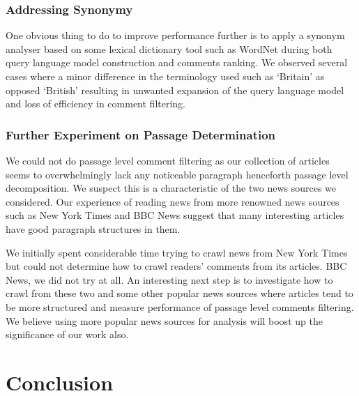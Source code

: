 \documentclass[article]{IEEEtran}
\begin{document}
\subsubsection{Addressing Synonymy}
One obvious thing to do to improve performance further is to apply a synonym analyser based on some lexical dictionary tool such as WordNet \cite{Miller:1995:WLD:219717.219748} during both query language model construction and comments ranking. We observed several cases where a minor difference in the terminology used such as `Britain' as opposed `British' resulting in unwanted expansion of the query language model and loss of efficiency in comment filtering.    

\subsubsection{Further Experiment on Passage Determination} We could not do passage level comment filtering as our collection of articles seems to overwhelmingly lack any noticeable paragraph henceforth passage level decomposition. We suspect this is a characteristic of the two news sources we considered. Our experience of reading news from more renowned news sources such as New York Times and BBC News suggest that many interesting articles have good paragraph structures in them. 

We initially spent considerable time trying to crawl news from New York Times but could not determine how to crawl readers' comments from its articles. BBC News, we did not try at all. An interesting next step is to investigate how to crawl from these two and some other popular news sources where articles tend to be more structured and measure performance of passage level comments filtering. We believe using more popular news sources for analysis will boost up the significance of our work also.     
 
\section{Conclusion}
\label{con}


 
\end{document}
